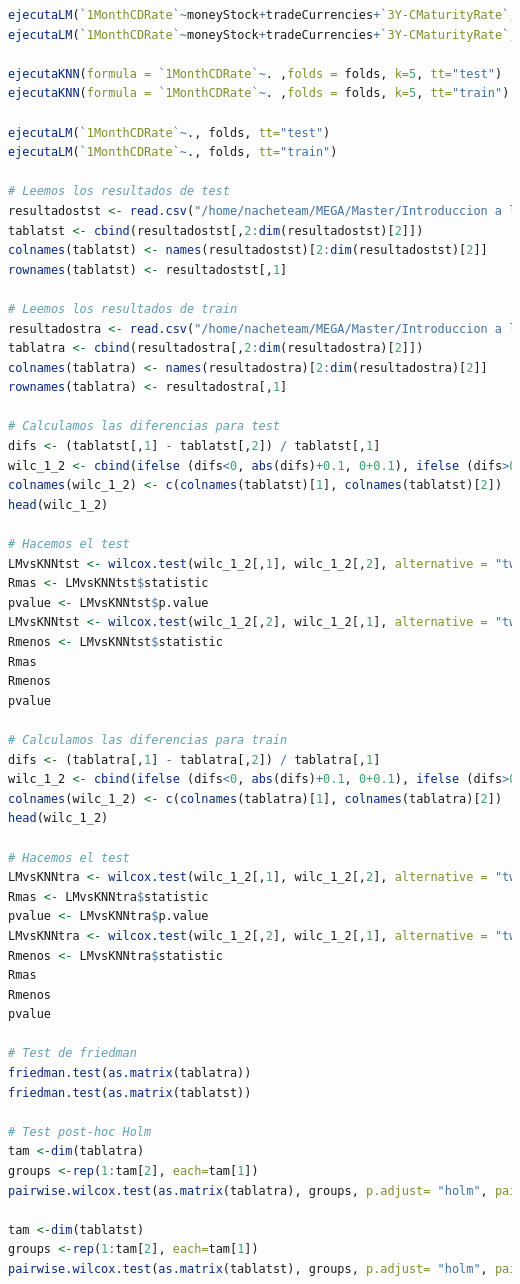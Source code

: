 \documentclass[12pt,a4paper]{article}
\begin{document}
\begin{lstlisting}[basicstyle=\tiny, language=R]
ejecutaLM(`1MonthCDRate`~moneyStock+tradeCurrencies+`3Y-CMaturityRate`, folds, tt="test")
ejecutaLM(`1MonthCDRate`~moneyStock+tradeCurrencies+`3Y-CMaturityRate`, folds, tt="train")

ejecutaKNN(formula = `1MonthCDRate`~. ,folds = folds, k=5, tt="test")
ejecutaKNN(formula = `1MonthCDRate`~. ,folds = folds, k=5, tt="train")

ejecutaLM(`1MonthCDRate`~., folds, tt="test")
ejecutaLM(`1MonthCDRate`~., folds, tt="train")

# Leemos los resultados de test
resultadostst <- read.csv("/home/nacheteam/MEGA/Master/Introduccion a la ciencia de datos/Trabajo Integrador/DATOS/Tablas de resultados para tests estadisticos/regr_test_alumnos.csv")
tablatst <- cbind(resultadostst[,2:dim(resultadostst)[2]])
colnames(tablatst) <- names(resultadostst)[2:dim(resultadostst)[2]]
rownames(tablatst) <- resultadostst[,1]

# Leemos los resultados de train
resultadostra <- read.csv("/home/nacheteam/MEGA/Master/Introduccion a la ciencia de datos/Trabajo Integrador/DATOS/Tablas de resultados para tests estadisticos/regr_train_alumnos.csv")
tablatra <- cbind(resultadostra[,2:dim(resultadostra)[2]])
colnames(tablatra) <- names(resultadostra)[2:dim(resultadostra)[2]]
rownames(tablatra) <- resultadostra[,1]

# Calculamos las diferencias para test
difs <- (tablatst[,1] - tablatst[,2]) / tablatst[,1]
wilc_1_2 <- cbind(ifelse (difs<0, abs(difs)+0.1, 0+0.1), ifelse (difs>0, abs(difs)+0.1, 0+0.1))
colnames(wilc_1_2) <- c(colnames(tablatst)[1], colnames(tablatst)[2])
head(wilc_1_2)

# Hacemos el test
LMvsKNNtst <- wilcox.test(wilc_1_2[,1], wilc_1_2[,2], alternative = "two.sided", paired=TRUE)
Rmas <- LMvsKNNtst$statistic
pvalue <- LMvsKNNtst$p.value
LMvsKNNtst <- wilcox.test(wilc_1_2[,2], wilc_1_2[,1], alternative = "two.sided", paired=TRUE)
Rmenos <- LMvsKNNtst$statistic
Rmas
Rmenos
pvalue

# Calculamos las diferencias para train
difs <- (tablatra[,1] - tablatra[,2]) / tablatra[,1]
wilc_1_2 <- cbind(ifelse (difs<0, abs(difs)+0.1, 0+0.1), ifelse (difs>0, abs(difs)+0.1, 0+0.1))
colnames(wilc_1_2) <- c(colnames(tablatra)[1], colnames(tablatra)[2])
head(wilc_1_2)

# Hacemos el test
LMvsKNNtra <- wilcox.test(wilc_1_2[,1], wilc_1_2[,2], alternative = "two.sided", paired=TRUE)
Rmas <- LMvsKNNtra$statistic
pvalue <- LMvsKNNtra$p.value
LMvsKNNtra <- wilcox.test(wilc_1_2[,2], wilc_1_2[,1], alternative = "two.sided", paired=TRUE)
Rmenos <- LMvsKNNtra$statistic
Rmas
Rmenos
pvalue

# Test de friedman
friedman.test(as.matrix(tablatra))
friedman.test(as.matrix(tablatst))

# Test post-hoc Holm
tam <-dim(tablatra)
groups <-rep(1:tam[2], each=tam[1])
pairwise.wilcox.test(as.matrix(tablatra), groups, p.adjust= "holm", paired = T)

tam <-dim(tablatst)
groups <-rep(1:tam[2], each=tam[1])
pairwise.wilcox.test(as.matrix(tablatst), groups, p.adjust= "holm", paired = T)

\end{lstlisting}
\end{document}
